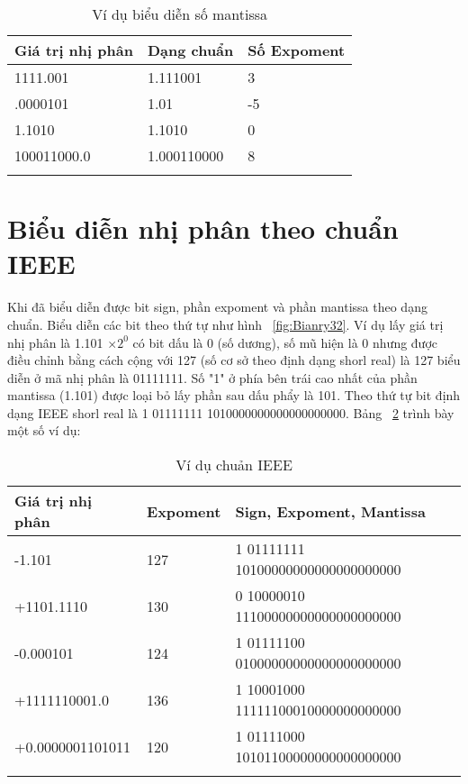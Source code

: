 	\begin{longtable}{|l|l|l|}
		\hline
			Giá trị nhị phân & Dạng chuẩn & Số Expoment \\
		\hline
		\hline
			1111.001 & 1.111001 & 3 \\
		\hline
			.0000101 & 1.01 & -5 \\
		\hline
			1.1010 & 1.1010 & 0 \\
		\hline
			100011000.0 & 1.000110000 &  8\\
		\hline
			\caption{Ví dụ biểu diễn số mantissa}
			\label{tb:VDMa}
	\end{longtable}

\section*{Biểu diễn nhị phân theo chuẩn IEEE}
	Khi đã biểu diễn được bit sign, phần expoment và phần mantissa theo dạng chuẩn. Biểu diễn các bit theo thứ tự như hình ~\ref{fig:Bianry32}. Ví dụ lấy giá trị nhị phân là 1.101 $\times 2^0$ có bit dấu là 0 (số dương), số mũ hiện là 0 nhưng được điều chỉnh bằng cách cộng với 127 (số cơ sở theo định dạng shorl real)  là 127 biểu diễn ở mã nhị phân là 01111111. Số "1" ở phía bên trái cao nhất của phần mantissa (1.101) được loại bỏ lấy phần sau dấu phẩy là 101. Theo thứ tự bit định dạng  IEEE shorl real là 1 01111111 1010000000000000000000. Bảng ~\ref{tb:VDIEEE} trình bày một số ví dụ:
	\begin{longtable}{|l|l|l|}
	\hline
		Giá trị nhị phân & Expoment & Sign, Expoment, Mantissa\\
	\hline
	\hline
		-1.101 & 127 & 1 01111111 10100000000000000000000 \\
	\hline
		+1101.1110 & 130 & 0 10000010 11100000000000000000000 \\
	\hline
		-0.000101 & 124 & 1 01111100 01000000000000000000000 \\
	\hline
		+1111110001.0 & 136 & 1 10001000 11111100010000000000000 \\
	\hline
		+0.0000001101011& 120 & 1 01111000 10101100000000000000000 \\
	\hline
		\caption{Ví dụ chuản IEEE}
		\label{tb:VDIEEE}
	\end{longtable}	
